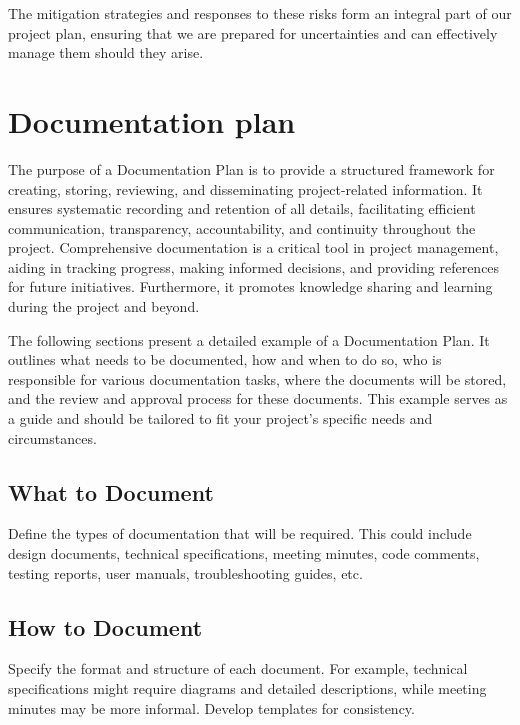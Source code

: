 \documentclass[10pt]{projectdoc}
\begin{document}
The mitigation strategies and responses to these risks form an integral part of our project plan, ensuring that we are prepared for uncertainties and can effectively manage them should they arise.

\newpage
\section{Documentation plan}

The purpose of a Documentation Plan is to provide a structured framework for creating, storing, reviewing, and disseminating project-related information. It ensures systematic recording and retention of all details, facilitating efficient communication, transparency, accountability, and continuity throughout the project. Comprehensive documentation is a critical tool in project management, aiding in tracking progress, making informed decisions, and providing references for future initiatives. Furthermore, it promotes knowledge sharing and learning during the project and beyond.

The following sections present a detailed example of a Documentation Plan. It outlines what needs to be documented, how and when to do so, who is responsible for various documentation tasks, where the documents will be stored, and the review and approval process for these documents. This example serves as a guide and should be tailored to fit your project's specific needs and circumstances.

\subsection{What to Document}

Define the types of documentation that will be required. This could include design documents, technical specifications, meeting minutes, code comments, testing reports, user manuals, troubleshooting guides, etc.

\subsection{How to Document}

Specify the format and structure of each document. For example, technical specifications might require diagrams and detailed descriptions, while meeting minutes may be more informal. Develop templates for consistency.
\end{document}
